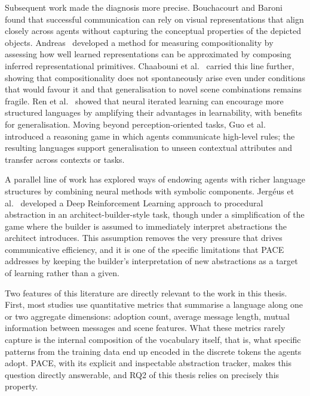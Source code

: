 Subsequent work made the diagnosis more precise. Bouchacourt and Baroni~\cite{bouchacourt_how_2018} found that successful communication can rely on visual representations that align closely across agents without capturing the conceptual properties of the depicted objects. Andreas~\cite{andreas_measuring_2019} developed a method for measuring compositionality by assessing how well learned representations can be approximated by composing inferred representational primitives. Chaabouni et al.~\cite{chaabouni_compositionality_2020} carried this line further, showing that compositionality does not spontaneously arise even under conditions that would favour it and that generalisation to novel scene combinations remains fragile. Ren et al.~\cite{ren_compositional_2020} showed that neural iterated learning can encourage more structured languages by amplifying their advantages in learnability, with benefits for generalisation. Moving beyond perception-oriented tasks, Guo et al.~\cite{guo_emergent_2023} introduced a reasoning game in which agents communicate high-level rules; the resulting languages support generalisation to unseen contextual attributes and transfer across contexts or tasks.

A parallel line of work has explored ways of endowing agents with richer language structures by combining neural methods with symbolic components. Jergéus et al.~\cite{jergus2022multiagent} developed a Deep Reinforcement Learning approach to procedural abstraction in an architect-builder-style task, though under a simplification of the game where the builder is assumed to immediately interpret abstractions the architect introduces. This assumption removes the very pressure that drives communicative efficiency, and it is one of the specific limitations that PACE addresses by keeping the builder's interpretation of new abstractions as a target of learning rather than a given.

Two features of this literature are directly relevant to the work in this thesis. First, most studies use quantitative metrics that summarise a language along one or two aggregate dimensions: adoption count, average message length, mutual information between messages and scene features. What these metrics rarely capture is the internal composition of the vocabulary itself, that is, what specific patterns from the training data end up encoded in the discrete tokens the agents adopt. PACE, with its explicit and inspectable abstraction tracker, makes this question directly answerable, and RQ2 of this thesis relies on precisely this property.

